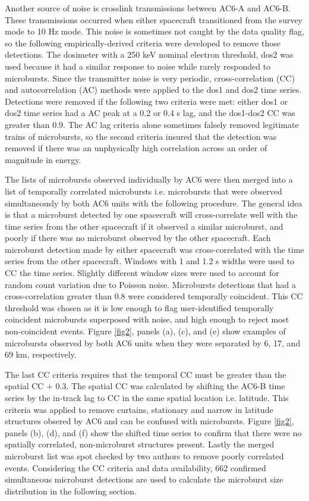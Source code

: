 \documentclass[draft]{agujournal2019}
\begin{document}
Another source of noise is crosslink transmissions between AC6-A and AC6-B. These transmissions occurred when either spacecraft transitioned from the survey mode to 10 Hz mode. This noise is sometimes not caught by the data quality flag, so the following empirically-derived criteria were developed to remove those detections. The dosimeter with a 250 keV nominal electron threshold, dos2 was used because it had a similar response to noise while rarely responded to microbursts. Since the transmitter noise is very periodic, cross-correlation (CC) and autocorrelation (AC) methods were applied to the dos1 and dos2 time series. Detections were removed if the following two criteria were met: either dos1 or dos2 time series had a AC peak at a 0.2 or 0.4 s lag, and the dos1-dos2 CC was greater than 0.9. The AC lag criteria alone sometimes falsely removed legitimate trains of microbursts, so the second criteria insured that the detection was removed if there was an unphysically high correlation across an order of magnitude in energy.

The lists of microbursts observed individually by AC6 were then merged into a list of temporally correlated microbursts i.e. microbursts that were observed simultaneously by both AC6 units with the following procedure. The general idea is that a microburst detected by one spacecraft will cross-correlate well with the time series from the other spacecraft if it observed a similar microburst, and poorly if there was no microburst observed by the other spacecraft. Each microburst detection made by either spacecraft was cross-correlated with the time series from the other spacecraft. Windows with 1 and 1.2 s widths were used to CC the time series. Slightly different window sizes were used to account for random count variation due to Poisson noise. Microbursts detections that had a cross-correlation greater than $0.8$ were considered temporally coincident. This CC threshold was chosen as it is low enough to flag user-identified temporally coincident microbursts superposed with noise, and high enough to reject most non-coincident events. Figure \ref{fig2}, panels (a), (c), and (e) show examples of microbursts observed by both AC6 units when they were separated by 6, 17, and 69 km, respectively. 

The last CC criteria requires that the temporal CC must be greater than the spatial CC + 0.3. The spatial CC was calculated by shifting the AC6-B time series by the in-track lag to CC in the same spatial location i.e. latitude. This criteria was applied to remove curtains, stationary and narrow in latitude structures obsered by AC6 \cite{Blake2016} and can be confused with microbursts. Figure \ref{fig2}, panels (b), (d), and (f) show the shifted time series to confirm that there were no spatially correlated, non-microburst structures present. Lastly the merged microburst list was spot checked by two authors to remove poorly correlated events. Considering the CC criteria and data availability, 662 confirmed simultaneous microburst detections are used to calculate the microburst size distribution in the following section.
\end{document}
